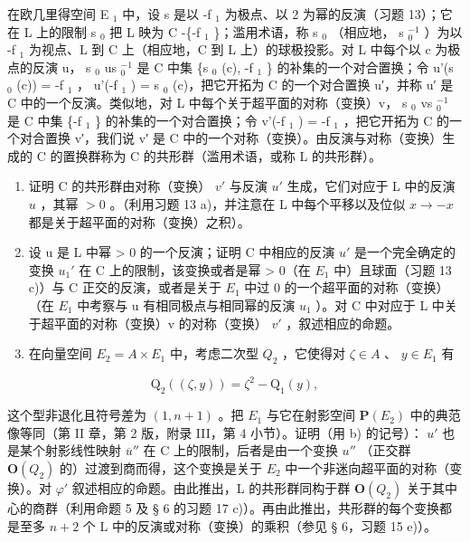 在欧几里得空间 E \(_{1}\) 中，设 s 是以 -f \(_{1}\) 为极点、以 2 为幂的反演（习题 13）；它在 L 上的限制 s \(_{0}\) 把 L 映为 C -\{-f \(_{1}\) \}；滥用术语，称 s \(_{0}\) （相应地， s \(_{0}^{-1}\) ）为以 -f \(_{1}\) 为视点、L 到 C 上（相应地，C 到 L 上）的球极投影。对 L 中每个以 c 为极点的反演 u， s \(_{0}\) us \(_{0}^{-1}\) 是 C 中集 \{s \(_{0}\) (c), -f \(_{1}\) \} 的补集的一个对合置换；令 u'(s \(_{0}\) (c)) = -f \(_{1}\) ， u'(-f \(_{1}\) ) = s \(_{0}\) (c)，把它开拓为 C 的一个对合置换 u′，并称 u′ 是 C 中的一个反演。类似地，对 L 中每个关于超平面的对称（变换）v， s \(_{0}\) vs \(_{0}^{-1}\) 是 C 中集 \{-f \(_{1}\) \} 的补集的一个对合置换；令 v'(-f \(_{1}\) ) = -f \(_{1}\) ，把它开拓为 C 的一个对合置换 v′，我们说 v′ 是 C 中的一个对称（变换）。由反演与对称（变换）生成的 C 的置换群称为 C 的共形群（滥用术语，或称 L 的共形群）。

\begin{enumerate}
\def\labelenumi{\alph{enumi})}
\item
  证明 C 的共形群由对称（变换） \(v'\) 与反演 \(u'\) 生成，它们对应于 L 中的反演 \(u\) ，其幂 \(>0\) 。（利用习题 13 a)，并注意在 L 中每个平移以及位似 \(x \to -x\) 都是关于超平面的对称（变换）之积）。
\item
  设 u 是 L 中幂 \textgreater{} 0 的一个反演；证明 C 中相应的反演 \(u'\) 是一个完全确定的变换 \(u_{1}'\) 在 C 上的限制，该变换或者是幂 \textgreater{} 0（在 \(E_{1}\) 中）且球面（习题 13 c)）与 C 正交的反演，或者是关于 \(E_{1}\) 中过 0 的一个超平面的对称（变换）（在 \(E_{1}\) 中考察与 u 有相同极点与相同幂的反演 \(u_{1}\) ）。对 C 中对应于 L 中关于超平面的对称（变换）v 的对称（变换） \(v'\) ，叙述相应的命题。
\item
  在向量空间 \(E_{2} = A \times E_{1}\) 中，考虑二次型 \(Q_{2}\) ，它使得对 \(\zeta \in A\) 、 \(y \in E_{1}\) 有
\end{enumerate}

\[
\mathrm{Q} _ {2} ((\zeta , y)) = \zeta^ {2} - \mathrm{Q} _ {1} (y),
\]

这个型非退化且符号差为 \((1, n + 1)\) 。把 \(E_{1}\) 与它在射影空间 \(\mathbf{P}(E_{2})\) 中的典范像等同（第 II 章，第 2 版，附录 III，第 4 小节）。证明（用 b) 的记号）： \(u'\) 也是某个射影线性映射 \(\overline{u}''\) 在 C 上的限制，后者是由一个变换 \(u''\) （正交群 \(\mathbf{O}(Q_{2})\) 的）过渡到商而得，这个变换是关于 \(E_{2}\) 中一个非迷向超平面的对称（变换）。对 \(\varphi'\) 叙述相应的命题。由此推出，L 的共形群同构于群 \(\mathbf{O}(Q_{2})\) 关于其中心的商群（利用命题 5 及 § 6 的习题 17 c)）。再由此推出，共形群的每个变换都是至多 \(n + 2\) 个 L 中的反演或对称（变换）的乘积（参见 § 6，习题 15 e)）。

